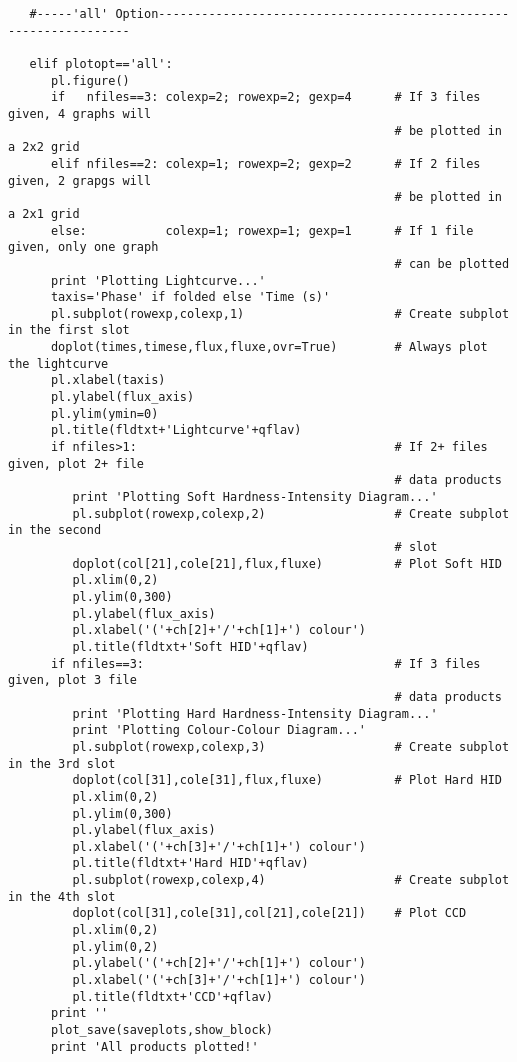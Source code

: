 \begin{verbatim}
   #-----'all' Option------------------------------------------------------------------

   elif plotopt=='all':
      pl.figure()
      if   nfiles==3: colexp=2; rowexp=2; gexp=4      # If 3 files given, 4 graphs will
                                                      # be plotted in a 2x2 grid
      elif nfiles==2: colexp=1; rowexp=2; gexp=2      # If 2 files given, 2 grapgs will
                                                      # be plotted in a 2x1 grid
      else:           colexp=1; rowexp=1; gexp=1      # If 1 file given, only one graph
                                                      # can be plotted
      print 'Plotting Lightcurve...'
      taxis='Phase' if folded else 'Time (s)'
      pl.subplot(rowexp,colexp,1)                     # Create subplot in the first slot
      doplot(times,timese,flux,fluxe,ovr=True)        # Always plot the lightcurve
      pl.xlabel(taxis)
      pl.ylabel(flux_axis)
      pl.ylim(ymin=0)
      pl.title(fldtxt+'Lightcurve'+qflav)
      if nfiles>1:                                    # If 2+ files given, plot 2+ file
                                                      # data products
         print 'Plotting Soft Hardness-Intensity Diagram...'
         pl.subplot(rowexp,colexp,2)                  # Create subplot in the second
                                                      # slot
         doplot(col[21],cole[21],flux,fluxe)          # Plot Soft HID
         pl.xlim(0,2)
         pl.ylim(0,300)
         pl.ylabel(flux_axis)
         pl.xlabel('('+ch[2]+'/'+ch[1]+') colour')
         pl.title(fldtxt+'Soft HID'+qflav)
      if nfiles==3:                                   # If 3 files given, plot 3 file
                                                      # data products
         print 'Plotting Hard Hardness-Intensity Diagram...'
         print 'Plotting Colour-Colour Diagram...'
         pl.subplot(rowexp,colexp,3)                  # Create subplot in the 3rd slot
         doplot(col[31],cole[31],flux,fluxe)          # Plot Hard HID
         pl.xlim(0,2)
         pl.ylim(0,300)
         pl.ylabel(flux_axis)
         pl.xlabel('('+ch[3]+'/'+ch[1]+') colour')
         pl.title(fldtxt+'Hard HID'+qflav)
         pl.subplot(rowexp,colexp,4)                  # Create subplot in the 4th slot
         doplot(col[31],cole[31],col[21],cole[21])    # Plot CCD
         pl.xlim(0,2)
         pl.ylim(0,2)
         pl.ylabel('('+ch[2]+'/'+ch[1]+') colour')
         pl.xlabel('('+ch[3]+'/'+ch[1]+') colour')
         pl.title(fldtxt+'CCD'+qflav)
      print ''
      plot_save(saveplots,show_block)
      print 'All products plotted!'


\end{verbatim}
